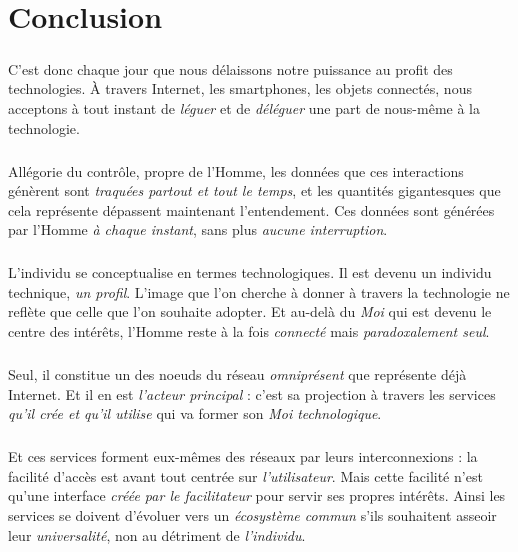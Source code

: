 \chapter{Conclusion}

\paragraph{} C'est donc chaque jour que nous délaissons notre puissance au profit des
technologies. À travers Internet, les smartphones, les objets connectés, nous acceptons
à tout instant de \emph{léguer} et de \emph{déléguer} une part de nous-même à la 
technologie. 

\paragraph{} Allégorie du contrôle, propre de l'Homme, les données que ces
interactions génèrent sont \emph{traquées partout et tout le temps}, et les quantités
gigantesques que cela représente dépassent maintenant l'entendement. Ces données sont
générées par l'Homme \emph{à chaque instant}, sans plus \emph{aucune interruption}. 

\paragraph{} L'individu se conceptualise en termes technologiques. Il est devenu un
individu technique, \emph{un profil}. L'image que l'on cherche à donner à travers la
technologie ne reflète que celle que l'on souhaite adopter. Et au-delà du \emph{Moi}
qui est devenu le centre des intérêts, l'Homme reste à la fois \emph{connecté} mais
\emph{paradoxalement seul}.

\paragraph{} Seul, il constitue un des noeuds du réseau \emph{omniprésent} que représente
déjà Internet. Et il en est \emph{l'acteur principal} : c'est sa projection à travers
les services \emph{qu'il crée et qu'il utilise} qui va former son \emph{Moi technologique}.

\paragraph{} Et ces services forment eux-mêmes des réseaux par leurs interconnexions : la facilité
d'accès est avant tout centrée sur \emph{l'utilisateur}. Mais cette facilité n'est qu'une interface
\emph{créée par le facilitateur} pour servir ses propres intérêts. Ainsi les services se doivent
d'évoluer vers un \emph{écosystème commun} s'ils souhaitent asseoir leur \emph{universalité},
non au détriment de \emph{l'individu}. 

